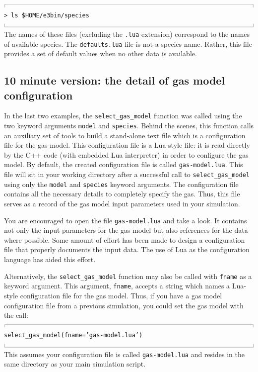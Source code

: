 \documentclass[12pt,a4paper,twoside]{article}
\newcommand{\topbar}{\ensuremath{
    \rule{0.1mm}{2.0mm} \rule[2.0mm]{159.5mm}{0.1mm} \rule{0.1mm}{2.0mm}
}}
\newcommand{\bottombar}{\ensuremath{
    \rule{0.1mm}{2.0mm} \rule{159.5mm}{0.1mm} \rule{0.1mm}{2.0mm}
}}
\begin{document}
\noindent
\topbar\\
\texttt{> ls \$HOME/e3bin/species}\\
\bottombar\\
%
The names of these files (excluding the \texttt{.lua} extension) correspond to the
names of available species.  The \texttt{defaults.lua} file is not a species name.
Rather, this file provides a set of default values when no other data is available.

\subsection{10 minute version: the detail of gas model configuration}
In the last two examples, the \texttt{select\_gas\_model} function was called using
the two keyword arguments \texttt{model} and \texttt{species}.
Behind the scenes, this function calls an auxiliary set of tools to build
a stand-alone text file which is a configuration file for the gas model.
This configuration file is a Lua-style file: it is read directly by the
C++ code (with embedded Lua interpreter) in order to configure the gas model.
By default, the created configuration file is called \texttt{gas-model.lua}.
This file will sit in your working directory after a successful call to
\texttt{select\_gas\_model} using only the \texttt{model} and \texttt{species} keyword
arguments.
The configuration file contains all the necessary details to completely
specify the gas.
Thus, this file serves as a record of the gas model input parameters used in
your simulation.

\medskip
You are encouraged to open the file \texttt{gas-model.lua} and take a look.
It contains not only the input parameters for the gas model but also references for the
data where possible.
Some amount of effort has been made to design a configuration file that
properly documents the input data.
The use of Lua as the configuration language has aided this effort.

\medskip
Alternatively, the \texttt{select\_gas\_model} function may also be called
with \texttt{fname} as a keyword argument.
This argument, \texttt{fname}, accepts a string which names a Lua-style configuration
file for the gas model.
Thus, if you have a gas model configuration file from a previous simulation, you could
set the gas model with the call:\\
%
\topbar\\
\texttt{select\_gas\_model(fname='gas-model.lua')}\\
\bottombar\\
%
This assumes your configuration file is called \texttt{gas-model.lua} and resides
in the same directory as your main simulation script.
\end{document}
